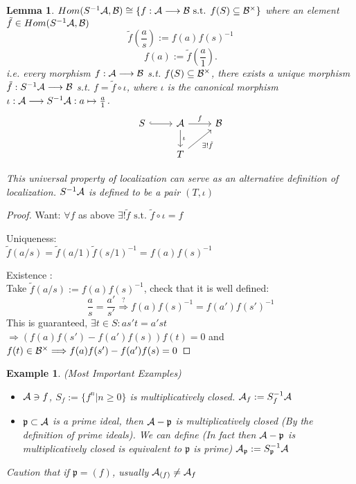 \documentclass[11pt]{article}
\newtheorem{lemma}[thm]{Lemma}
\newtheorem{ex}[thm]{Example}
\newcommand{\scp}{{\mathfrak p}}
\newcommand{\cala}{{\cal A}}
\newcommand{\calb}{{\cal B}}
\newcommand{\Lrta}{\Longrightarrow}
\newcommand{\lrta}{\longrightarrow}
\begin{document}
\begin{lemma}
$Hom(S^{-1}\cala,\calb)\cong \{f:\cala\lrta \calb\text{ s.t. } f(S)\subseteq \calb^{\times}\}$ 
where an element $\tilde{f}\in Hom(S^{-1}\cala,\calb)$
$$
\tilde{f}\left(\frac{a}{s}\right):=f(a)f(s)^{-1}
$$
$$
f(a):=\tilde{f}\left(\frac{a}{1}\right).
$$
i.e. every morphism $f:\cala\lrta\calb$ s.t. $f(S)\subseteq \calb^{\times}$, there exists a unique morphism $\tilde{f}:S^{-1}\cala\lrta \calb$ s.t. $f=\tilde{f}\circ\iota$, where $\iota $ is the canonical morphism $\iota:\cala\lrta S^{-1}\cala:a\mapsto \frac{a}{1}$.
\[
\begin{tikzcd}
S\ar[r,hook] &\cala  \arrow[r,"f"] \arrow[d,"\iota"] & \calb \\
&T\arrow[ur,swap,"\exists !\tilde{f}"]  &    
\end{tikzcd}
\]
 
This universal property of localization can serve as an alternative definition of localization. $S^{-1}\cala$ is defined to be a pair $(T,\iota)$

\end{lemma}
\begin{proof}
Want: $\forall f$ as above $\exists ! \tilde{f}\text{ s.t. } \tilde{f}\circ\iota=f$

Uniqueness:\\
$\tilde{f}(a/s)=\tilde{f}(a/1)\tilde{f}(s/1)^{-1}=f(a)f(s)^{-1}$

Existence :\\
Take $\tilde{f}(a/s):=f(a)f(s)^{-1}$, check that it is well defined:
$$
\frac{a}{s}=\frac{a'}{s'}\overset{?}{\Lrta} f(a)f(s)^{-1}=f(a')f(s')^{-1}
$$
This is guaranteed, $\exists t\in S: as' t=a's t$ $\Lrta (f(a)f(s')-f(a')f(s))f(t)=0$ and $f(t)\in \calb^{\times}\Lrta f(a)f(s')-f(a')f(s)=0$
\end{proof}

\begin{ex}
(Most Important Examples)
\begin{itemize}
    \item 
    $\cala\ni f$, $S_f:=\{f^n|n\geq 0\}$ is multiplicatively closed. $\cala_f:=S^{-1}_f\cala$
    \item
    $\scp\subset \cala$ is a prime ideal, then $\cala-\scp$ is multiplicatively closed (By the definition of prime ideals). We can define (In fact then $\cala-\scp$ is multiplicatively closed is equivalent to $\scp$ is prime)
    $\cala_{\scp}:=S_{\scp}^{-1}\cala$
\end{itemize}
Caution that if $\scp=(f)$, usually $\cala_{(f)}\neq \cala_{f}$
\end{ex}
\end{document}
